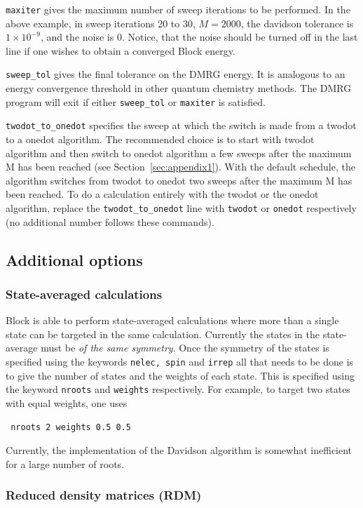 \documentclass[letterpaper,12pt,aps, pra]{revtex4-1}
\begin{document}
\texttt{maxiter} gives the maximum number of sweep iterations to be performed.
In the above example, in sweep iterations 20 to 30, $M=2000$, the davidson
tolerance is $1\times 10^{-9}$, and the noise is 0. Notice, that the noise
should be turned off in the last line if one wishes to obtain a converged Block
energy.

\texttt{sweep\_tol} gives the final tolerance on the DMRG energy. It is
analogous to an energy convergence threshold in other quantum chemistry
methods.  The DMRG program will exit if either \texttt{sweep\_tol} or
\texttt{maxiter} is satisfied.

\texttt{twodot\_to\_onedot} specifies the sweep at which the switch is made
from a twodot to a onedot algorithm. The recommended choice is to start with
twodot algorithm and then switch to onedot algorithm a few sweeps after the
maximum M has been reached (see Section~\ref{sec:appendix1}).  With the default
schedule, the algorithm switches from twodot to onedot two sweeps after the
maximum M has been reached.  To do a calculation entirely with the twodot or
the onedot algorithm, replace the \texttt{twodot\_to\_onedot} line with
\texttt{twodot} or \texttt{onedot} respectively (no additional number follows
these commands). 

\subsection{Additional options}

\subsubsection{State-averaged calculations}
Block is able to perform state-averaged calculations where more than a single
state can be targeted in the same calculation. Currently the states in the
state-average must be \emph{of the same symmetry}. Once the symmetry of the
states is specified using the keywords \texttt{nelec, spin} and \texttt{irrep}
all that needs to be done is to give the number of states and the weights of
each state. This is specified using the keyword \texttt{nroots} and
\texttt{weights} respectively. For example, to target two states with equal
weights, one uses \begin{verbatim} nroots 2 weights 0.5 0.5 \end{verbatim}
Currently, the implementation of the Davidson algorithm is somewhat inefficient
for a large number of roots.

\subsubsection{Reduced density matrices (RDM)}
\end{document}
